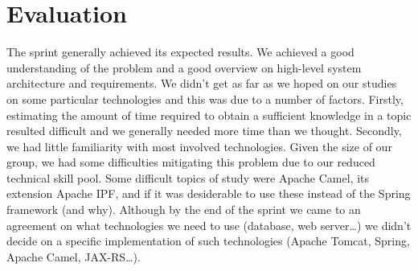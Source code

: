 
\section{Evaluation}

The sprint generally achieved its expected results.
We achieved a good understanding of the problem and a good overview on high-level system architecture
and requirements. We didn't get as far as we hoped on our studies on some particular technologies and this was
due to a number of factors. Firstly, estimating the amount of time required to obtain a sufficient knowledge
in a topic resulted difficult and we generally needed more time than we thought.
Secondly, we had little familiarity with most involved technologies.
Given the size of our group, we had some difficulties mitigating this problem due to
our reduced technical skill pool. Some difficult topics of study were Apache Camel, its extension Apache IPF,
and if it was desiderable to use these instead of the Spring framework (and why).
Although by the end of the sprint we came to an agreement on what technologies we need to use
(database, web server\ldots) we didn't decide on a specific implementation of such technologies
(Apache Tomcat, Spring, Apache Camel, JAX-RS\ldots).
